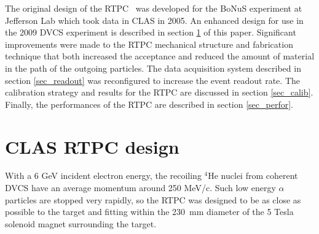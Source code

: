\documentclass[twocolumn,showpacs,superscriptaddress,groupedaddress]{revtex4}
\begin{document}
The original design of the RTPC~\cite{BONUS-NIM} was developed for the BoNuS 
experiment at Jefferson Lab which took data in CLAS in 2005. An enhanced design 
for use in the 2009 DVCS experiment is described in section \ref{sec_design} 
of this paper. Significant improvements were made to the RTPC mechanical 
structure and fabrication technique that both increased the acceptance and 
reduced the amount of material in the path of the outgoing particles. The 
data acquisition system described in section \ref{sec_readout} was reconfigured 
to increase the event readout rate. The calibration strategy and results for 
the RTPC are discussed in section \ref{sec_calib}. Finally, the performances
of the RTPC are described in section \ref{sec_perfor}.

\section{CLAS RTPC design} \label{sec_design}

With a 6 GeV incident electron energy, the recoiling $^{4}$He nuclei from coherent 
DVCS have an average momentum around 250 MeV/c. Such low energy $\alpha$ 
particles are stopped very rapidly, so the RTPC was designed to be as close 
as possible to the target and fitting within the 230~mm diameter 
of the 5 Tesla solenoid magnet surrounding the target. 
\end{document}
